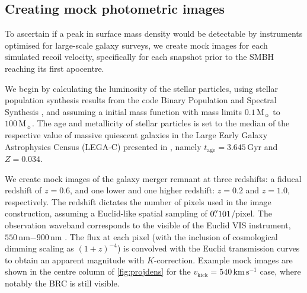 \documentclass[twocolumn]{aastex631}
\newcommand{\Msun}{\ensuremath{\mathrm{M}_{\sun}}}            %
\newcommand{\kmps}{\ensuremath{\mathrm{km}\,\mathrm{s}^{-1}} }%
\newcommand{\vk}{\ensuremath{v_\mathrm{kick}}}                %
\begin{document}
\subsection{Creating mock photometric images}\label{ssec:mock_obs}
To ascertain if a peak in surface mass density would be detectable by instruments optimised for large-scale galaxy surveys, we create mock images for each simulated recoil velocity, specifically for each snapshot prior to the SMBH reaching its first apocentre.

We begin by calculating the luminosity of the stellar particles, using stellar population synthesis results from the code Binary Population and Spectral Synthesis \citep[BPASS,][]{stanway2018}, and assuming a \citet{chabrier2003} initial mass function with mass limits $0.1\,\Msun$ to $100\,\Msun$.
The age and metallicity of stellar particles is set to the median of the respective value of massive quiescent galaxies in the Large Early Galaxy Astrophysics Census (LEGA-C) presented in \citet{bevacqua2024}, namely $t_\mathrm{age}=3.645\,\mathrm{Gyr}$ and $Z=0.034$.

We create mock images of the galaxy merger remnant at three redshifts: a fiducal redshift of $z=0.6$, and one lower and one higher redshift: $z=0.2$ and $z=1.0$, respectively.
The redshift dictates the number of pixels used in the image construction, assuming a Euclid-like spatial sampling of $0\mbox{$.\!\!^{\prime\prime}$}101$/pixel.
The observation waveband corresponds to the visible of the Euclid VIS instrument, $550\,\mathrm{nm} \mathrm{-} 900\,\mathrm{nm}$ \citep{cropper2024}. 
The flux at each pixel (with the inclusion of cosmological dimming scaling as $(1+z)^{-4}$) is convolved with the Euclid transmission curves to obtain an apparent magnitude with $K$-correction.
Example mock images are shown in the centre column of \autoref{fig:projdens} for the $\vk=540\,\kmps$ case, where notably the BRC is still visible.
\end{document}
